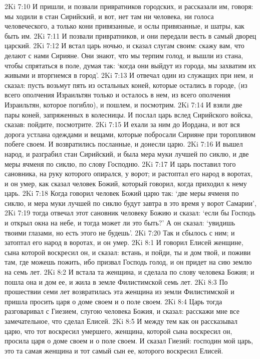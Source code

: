 2Ki 7:10  И пришли, и позвали привратников городских, и рассказали им, говоря: мы ходили в стан Сирийский, и вот, нет там ни человека, ни голоса человеческого, а только кони привязанные, и ослы привязанные, и шатры, как быть им.
2Ki 7:11  И позвали привратников, и они передали весть в самый дворец царский.
2Ki 7:12  И встал царь ночью, и сказал слугам своим: скажу вам, что делают с нами Сирияне. Они знают, что мы терпим голод, и вышли из стана, чтобы спрятаться в поле, думая так: `когда они выйдут из города, мы захватим их живыми и вторгнемся в город'.
2Ki 7:13  И отвечал один из служащих при нем, и сказал: пусть возьмут пять из остальных коней, которые остались в городе, (из всего ополчения Израильтян только и осталось в нем, из всего ополчения Израильтян, которое погибло), и пошлем, и посмотрим.
2Ki 7:14  И взяли две пары коней, запряженных в колесницы. И послал царь вслед Сирийского войска, сказав: пойдите, посмотрите.
2Ki 7:15  И ехали за ним до Иордана, и вот вся дорога устлана одеждами и вещами, которые побросали Сирияне при торопливом побеге своем. И возвратились посланные, и донесли царю.
2Ki 7:16  И вышел народ, и разграбил стан Сирийский, и была мера муки лучшей по сиклю, и две меры ячменя по сиклю, по слову Господню.
2Ki 7:17  И царь поставил того сановника, на руку которого опирался, у ворот; и растоптал его народ в воротах, и он умер, как сказал человек Божий, который говорил, когда приходил к нему царь.
2Ki 7:18  Когда говорил человек Божий царю так: `две меры ячменя по сиклю, и мера муки лучшей по сиклю будут завтра в это время у ворот Самарии',
2Ki 7:19  тогда отвечал этот сановник человеку Божию и сказал: `если бы Господь и открыл окна на небе, и тогда может ли это быть?' А он сказал: `увидишь твоими глазами, но есть этого не будешь'.
2Ki 7:20  Так и сбылось с ним; и затоптал его народ в воротах, и он умер.
2Ki 8:1  И говорил Елисей женщине, сына которой воскресил он, и сказал: встань, и пойди, ты и дом твой, и поживи там, где можешь пожить, ибо призвал Господь голод, и он придет на сию землю на семь лет.
2Ki 8:2  И встала та женщина, и сделала по слову человека Божия; и пошла она и дом ее, и жила в земле Филистимской семь лет.
2Ki 8:3  По прошествии семи лет возвратилась эта женщина из земли Филистимской и пришла просить царя о доме своем и о поле своем.
2Ki 8:4  Царь тогда разговаривал с Гиезием, слугою человека Божия, и сказал: расскажи мне все замечательное, что сделал Елисей.
2Ki 8:5  И между тем как он рассказывал царю, что тот воскресил умершего, женщина, которой сына воскресил он, просила царя о доме своем и о поле своем. И сказал Гиезий: господин мой царь, это та самая женщина и тот самый сын ее, которого воскресил Елисей.
